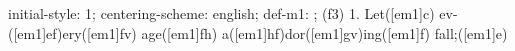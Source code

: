 initial-style: 1;
centering-scheme: english;
def-m1: \grealign;
(f3) 1. Let([em1]c) ev-([em1]ef)ery([em1]fv) age([em1]fh) a([em1]hf)dor([em1]gv)ing([em1]f) fall;([em1]e)